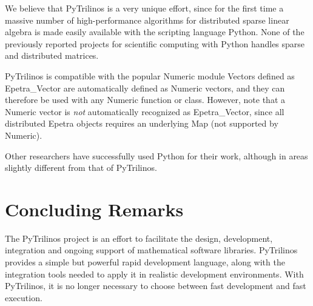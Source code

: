 \documentclass[10pt,relax]{SANDreport}
\begin{document}
We believe that PyTrilinos is a very unique effort, since for the first time a
massive number of high-performance algorithms for distributed sparse linear
algebra is made easily available with the scripting language Python.  None of
the previously reported projects for scientific computing with Python handles
sparse and distributed matrices. 

\smallskip

PyTrilinos is compatible with the popular Numeric module
Vectors defined as Epetra\_Vector are automatically defined as Numeric
vectors, and they can therefore be used with any Numeric function or class.
However, note that a Numeric vector is {\sl not} automatically recognized as
Epetra\_Vector, since all distributed Epetra objects requires an underlying
Map (not supported by Numeric).

\bigskip
{}
\bigskip

Other researchers have successfully used Python for their work, although in
areas slightly different from that of PyTrilinos. 

\section{Concluding Remarks}
\label{sec:concluding}

The PyTrilinos project is an effort to facilitate the design, development,
integration and ongoing support of mathematical software libraries. 
PyTrilinos provides a simple but powerful rapid development language, along with
the integration tools needed to apply it in realistic development
environments. With PyTrilinos, it is no longer necessary to choose between fast
development and fast execution.
\end{document}
